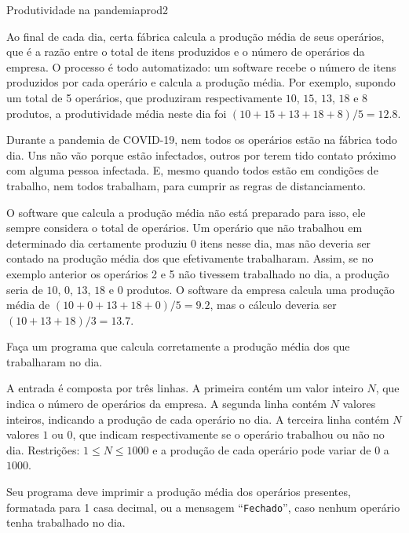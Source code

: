 \documentclass[12pt,a4paper,oneside]{article}
\begin{document}
\begin{problem}{Produtividade na pandemia}{prod}{2}

\small
Ao final de cada dia, certa fábrica calcula a produção média de seus operários, que é a razão entre o total de itens produzidos e o número de operários da empresa. O processo é todo automatizado: um software recebe o número de itens produzidos por cada operário e calcula a produção média. Por exemplo, supondo um total de 5 operários, que produziram respectivamente $10$, $15$, $13$, $18$ e $8$ produtos, a produtividade média neste dia foi $(10+15+13+18+8)/5 = 12.8$.

Durante a pandemia de COVID-19, nem todos os operários estão na fábrica todo dia. Uns não vão porque estão infectados, outros por terem tido contato próximo com alguma pessoa infectada. E, mesmo quando todos estão em condições de trabalho, nem todos trabalham, para cumprir as regras de distanciamento.

O software que calcula a produção média não está preparado para isso, ele sempre considera o total de operários. Um operário que não trabalhou em determinado dia certamente produziu 0 itens nesse dia, mas não deveria ser contado na produção média dos que efetivamente trabalharam. Assim, se no exemplo anterior os operários 2 e 5 não tivessem trabalhado no dia, a produção seria de $10$, $0$, $13$, $18$ e $0$ produtos. O software da empresa calcula uma produção média de $(10+0+13+18+0)/5 = 9.2$, mas o cálculo deveria ser $(10+13+18)/3 = 13.7$.

Faça um programa que calcula corretamente a produção média dos que trabalharam no dia.

%

\InputFile

A entrada é composta por três linhas. A primeira contém um valor inteiro $N$, que indica o número de operários da empresa. A segunda linha contém $N$ valores inteiros, indicando a produção de cada operário no dia. A terceira linha contém $N$ valores $1$ ou $0$, que indicam respectivamente se o operário trabalhou ou não no dia. Restrições: $1 \leq N \leq 1000$ e a produção de cada operário pode variar de $0$ a $1000$.

\OutputFile

Seu programa deve imprimir a produção média dos operários presentes, formatada para 1 casa decimal, ou a mensagem ``\texttt{Fechado}'', caso nenhum operário tenha trabalhado no dia.



\end{problem}
\end{document}
